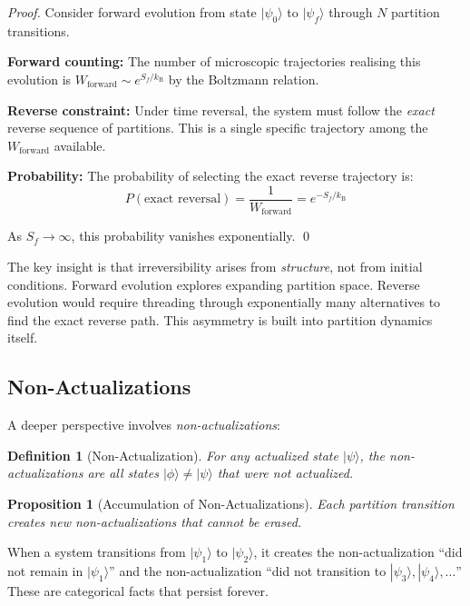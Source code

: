 \documentclass[twocolumn,10pt,aps,prd,superscriptaddress,nofootinbib]{revtex4-2}
\newtheorem{proposition}[theorem]{Proposition}
\newtheorem{definition}[theorem]{Definition}
\theoremstyle{remark}
\newcommand{\kB}{k_{\mathrm{B}}}
\begin{document}
\begin{proof}
Consider forward evolution from state $|\psi_0\rangle$ to $|\psi_f\rangle$ through $N$ partition transitions.

\textbf{Forward counting:} The number of microscopic trajectories realising this evolution is $W_{\text{forward}} \sim e^{S_f/\kB}$ by the Boltzmann relation.

\textbf{Reverse constraint:} Under time reversal, the system must follow the \emph{exact} reverse sequence of partitions. This is a single specific trajectory among the $W_{\text{forward}}$ available.

\textbf{Probability:} The probability of selecting the exact reverse trajectory is:
\begin{equation}
P(\text{exact reversal}) = \frac{1}{W_{\text{forward}}} = e^{-S_f/\kB}
\end{equation}

As $S_f \to \infty$, this probability vanishes exponentially. \qed
\end{proof}

The key insight is that irreversibility arises from \emph{structure}, not from initial conditions. Forward evolution explores expanding partition space. Reverse evolution would require threading through exponentially many alternatives to find the exact reverse path. This asymmetry is built into partition dynamics itself.

\subsection{Non-Actualizations}

A deeper perspective involves \emph{non-actualizations}:

\begin{definition}[Non-Actualization]
\label{def:non_actualization}
For any actualized state $|\psi\rangle$, the non-actualizations are all states $|\phi\rangle \neq |\psi\rangle$ that were not actualized.
\end{definition}

\begin{proposition}[Accumulation of Non-Actualizations]
\label{prop:non_actualizations}
Each partition transition creates new non-actualizations that cannot be erased.
\end{proposition}

When a system transitions from $|\psi_1\rangle$ to $|\psi_2\rangle$, it creates the non-actualization ``did not remain in $|\psi_1\rangle$'' and the non-actualization ``did not transition to $|\psi_3\rangle, |\psi_4\rangle, \ldots$'' These are categorical facts that persist forever.
\end{document}
